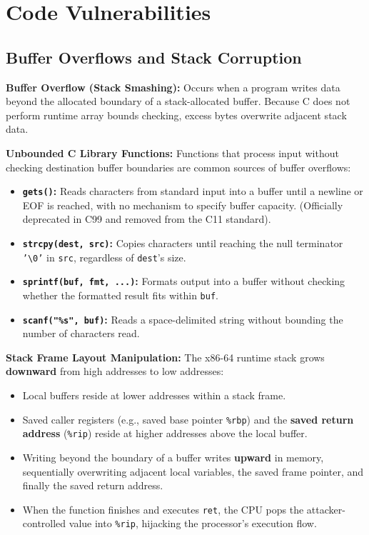 \section{Code Vulnerabilities}

\subsection{Buffer Overflows and Stack Corruption}

\begin{definition}
    \textbf{Buffer Overflow (Stack Smashing):} Occurs when a program writes data beyond the allocated boundary of a stack-allocated buffer. Because C does not perform runtime array bounds checking, excess bytes overwrite adjacent stack data.
\end{definition}

\begin{definition}
    \textbf{Unbounded C Library Functions:} Functions that process input without checking destination buffer boundaries are common sources of buffer overflows:
    \begin{itemize}
        \item \textbf{\texttt{gets()}:} Reads characters from standard input into a buffer until a newline or EOF is reached, with no mechanism to specify buffer capacity. (Officially deprecated in C99 and removed from the C11 standard).
        \item \textbf{\texttt{strcpy(dest, src)}:} Copies characters until reaching the null terminator \texttt{'\textbackslash0'} in \texttt{src}, regardless of \texttt{dest}'s size.
        \item \textbf{\texttt{sprintf(buf, fmt, ...)}:} Formats output into a buffer without checking whether the formatted result fits within \texttt{buf}.
        \item \textbf{\texttt{scanf("\%s", buf)}:} Reads a space-delimited string without bounding the number of characters read.
    \end{itemize}
\end{definition}

\begin{definition}
    \textbf{Stack Frame Layout Manipulation:}
    The x86-64 runtime stack grows \textbf{downward} from high addresses to low addresses:
    \begin{itemize}
        \item Local buffers reside at lower addresses within a stack frame.
        \item Saved caller registers (e.g., saved base pointer \texttt{\%rbp}) and the \textbf{saved return address} (\texttt{\%rip}) reside at higher addresses above the local buffer.
        \item Writing beyond the boundary of a buffer writes \textbf{upward} in memory, sequentially overwriting adjacent local variables, the saved frame pointer, and finally the saved return address.
        \item When the function finishes and executes \texttt{ret}, the CPU pops the attacker-controlled value into \texttt{\%rip}, hijacking the processor's execution flow.
    \end{itemize}
\end{definition}

